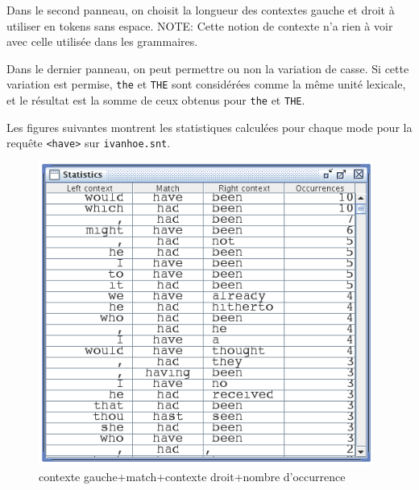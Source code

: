 \bigskip
\noindent Dans le second panneau, on choisit la longueur des contextes gauche et droit à utiliser en
tokens sans espace.
NOTE: Cette notion de contexte n'a rien à voir avec celle utilisée dans les grammaires.


\bigskip
\noindent Dans le dernier panneau, on peut permettre ou non la variation de casse.
Si cette variation est permise, \verb$the$ et \verb$THE$ sont considérées comme la même unité
lexicale, et le résultat est la somme de ceux obtenus pour \verb$the$ et \verb$THE$.

\bigskip
\noindent Les figures suivantes montrent les statistiques calculées pour chaque mode pour la requête
\verb$<have>$ sur \verb$ivanhoe.snt$.


\bigskip
\begin{figure}[!ht]
\begin{center}
\includegraphics[width=11cm]{resources/img/fig4-10.png}
\caption{contexte gauche+match+contexte droit+nombre d'occurrence\label{fig-statistics-mode0}}
\end{center}
\end{figure}

